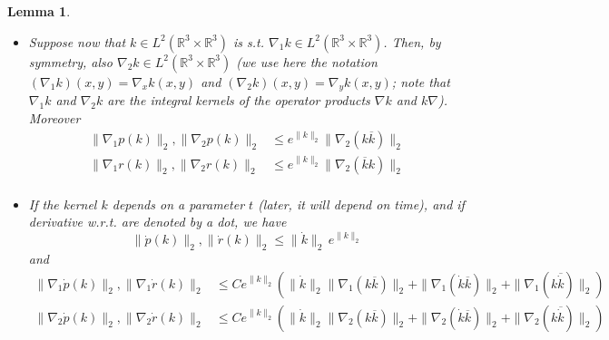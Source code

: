 \documentclass[11pt,a4paper,DIV11]{scrartcl}	%
\newtheorem{lem}[thm]{Lemma}
\newcommand{\bR}{{\mathbb R}}
\begin{document}
\begin{lem}
\begin{itemize}
\begin{equation}
\begin{split}
\end{split} \end{equation}
\item[(iv)] Suppose now that $k \in L^2 (\bR^3 \times \bR^3)$ is s.t. $\nabla_1 k  \in L^2 (\bR^3 \times \bR^3)$. Then, by symmetry, also $\nabla_2 k \in L^2 (\bR^3 \times \bR^3)$ (we use here the notation $(\nabla_1 k) (x,y) = \nabla_x k (x,y)$ and $(\nabla_2 k)(x,y) = \nabla_y k (x,y)$; note that $\nabla_1 k$ and $\nabla_2 k$ are the integral kernels of the operator products $\nabla k$ and $k \nabla$). Moreover 
\[  \begin{split}  \| \nabla_1 p (k) \|_{2} , \| \nabla_2 p (k) \|_2 & \le e^{\| k \|_{2}} \| \nabla_2 (k \overline{k}) \|_{2} \\
 \| \nabla_1 r (k)  \|_{2}, \| \nabla_2 r (k) \|_2 & \le e^{\| k \|_{2}} \| \nabla_2 (\overline{k} k)   \|_2 \\
  \end{split} \]
\item[(v)] If the kernel $k$ depends on a parameter $t$ (later, it will depend on time), and if derivative w.r.t. are denoted by a dot, we have
\[   \| \dot{p} (k) \|_2 , \| \dot{r} (k)\|_2  \leq \| \dot{k} \|_2 \, e^{\| k \|_2} \]
and
\[ \begin{split} 
\| \nabla_1 \dot p (k) \|_2 , \| \nabla_1 \dot r (k) \|_2  &\leq C  e^{\| k \|_2} \left( \| \dot k \|_2 \| \nabla_1 (k\overline{k}) \|_2 + \| \nabla_1 (\dot{k} \overline{k}) \|_2 + \| \nabla_1 (k \overline{\dot{k}}) \|_2 \right) \\
 \| \nabla_2 \dot p (k) \|_2 , \| \nabla_2 \dot r (k) \|_2  &\leq C  e^{\| k \|_2} \left( \| \dot k \|_2 \| \nabla_2 (k\overline{k}) \|_2 + \| \nabla_2 (\dot{k} \overline{k}) \|_2 + \| \nabla_2 (k \overline{\dot{k}}) \|_2 \right) 
 \end{split} \]
\end{itemize}
\end{lem}
\end{document}
